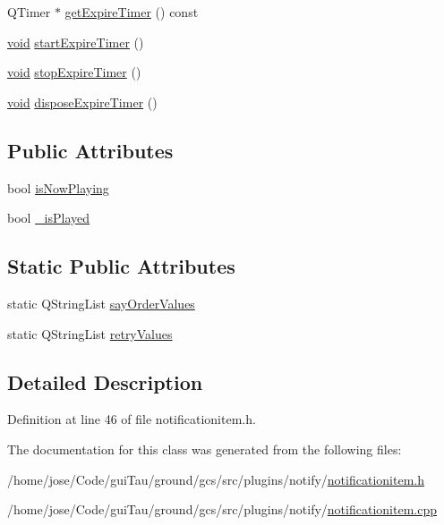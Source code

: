 \begin{DoxyCompactItemize}
\item 
Q\-Timer $\ast$ \hyperlink{group__notifyplugin_gac3e54f4c867cf1ab32a5127dcc5dcebe}{get\-Expire\-Timer} () const 
\item 
\hyperlink{group___u_a_v_objects_plugin_ga444cf2ff3f0ecbe028adce838d373f5c}{void} \hyperlink{group__notifyplugin_ga1cea7db89fc4ba5cc6177e4676fc6f5b}{start\-Expire\-Timer} ()
\item 
\hyperlink{group___u_a_v_objects_plugin_ga444cf2ff3f0ecbe028adce838d373f5c}{void} \hyperlink{group__notifyplugin_gafff508e9352fb1a5ed40502e6845ebef}{stop\-Expire\-Timer} ()
\item 
\hyperlink{group___u_a_v_objects_plugin_ga444cf2ff3f0ecbe028adce838d373f5c}{void} \hyperlink{group__notifyplugin_ga701d292a397a1198e167f249475b77e0}{dispose\-Expire\-Timer} ()
\end{DoxyCompactItemize}
\subsection*{Public Attributes}
\begin{DoxyCompactItemize}
\item 
bool \hyperlink{group__notifyplugin_gabd9ee81e318805b60e89e7045eb7deaa}{is\-Now\-Playing}
\item 
bool \hyperlink{group__notifyplugin_ga6469ec28d3051122de855c266d0dc6dd}{\-\_\-is\-Played}
\end{DoxyCompactItemize}
\subsection*{Static Public Attributes}
\begin{DoxyCompactItemize}
\item 
static Q\-String\-List \hyperlink{group__notifyplugin_ga856cd4e9d78e6c8900f9de74f0f25dac}{say\-Order\-Values}
\item 
static Q\-String\-List \hyperlink{group__notifyplugin_ga7c47e100b3ea3f8b527dbdea2385edd0}{retry\-Values}
\end{DoxyCompactItemize}


\subsection{Detailed Description}


Definition at line 46 of file notificationitem.\-h.



The documentation for this class was generated from the following files\-:\begin{DoxyCompactItemize}
\item 
/home/jose/\-Code/gui\-Tau/ground/gcs/src/plugins/notify/\hyperlink{notificationitem_8h}{notificationitem.\-h}\item 
/home/jose/\-Code/gui\-Tau/ground/gcs/src/plugins/notify/\hyperlink{notificationitem_8cpp}{notificationitem.\-cpp}\end{DoxyCompactItemize}
